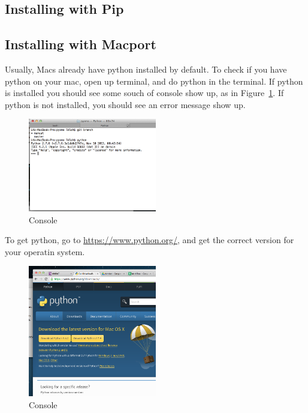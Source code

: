 \documentclass[letterpaper,10pt]{article}
\begin{document}
\subsection{Installing with Pip}


\subsection{Installing with Macport}

Usually, Macs already have python installed by default. To check if you have python on your mac,
open up terminal, and do python in the terminal. If python is installed you should see some souch of console show up, as in Figure~\ref{fig:python_console}. If python is not installed, you should see an error message show up. 

\begin{figure}[h!]
  \centering
  \includegraphics[width=0.5\textwidth]{images/python_console}
  \caption{Console}
  \label{fig:python_console}
\end{figure}

To get python, go to \url{https://www.python.org/}, and get the correct version for your operatin system. 

\begin{figure}[h!]
  \centering
  \includegraphics[width=0.5\textwidth]{images/python_version}
  \caption{Console}
  \label{fig:python_version}
\end{figure}
\end{document}
